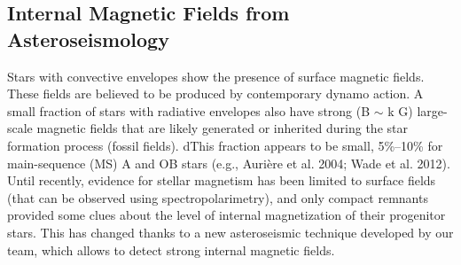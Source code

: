 {\color{red}\subsection{Internal Magnetic Fields from Asteroseismology}}
Stars with convective envelopes show the presence of
surface magnetic fields. These fields are believed to be produced by contemporary dynamo action.
A small fraction of stars with radiative envelopes also have strong (B $\sim$ k G)
large-scale magnetic fields that are likely generated or inherited during the star
formation process (fossil fields). dThis fraction appears to be small, 5\%–10\% for main-sequence (MS) A and OB stars (e.g., Aurière et al. 2004; Wade et al. 2012).
Until recently, evidence for stellar magnetism has been limited to surface fields (that can be observed using spectropolarimetry),
and only compact remnants provided some clues about the level of internal magnetization of their progenitor stars.
This has changed thanks to a new asteroseismic technique developed by our team, which allows to detect strong internal magnetic fields.